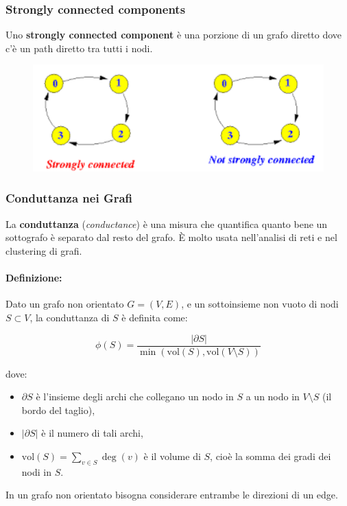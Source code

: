 \subsubsection*{Strongly connected components}
Uno \textbf{strongly connected component} è una porzione di un grafo diretto dove c'è un path diretto tra tutti i nodi. 
\\
\begin{figure}[th]
    \centering
    \includegraphics[scale=0.4]{Introduction/img/stronglyconnected.png}
    \label{fig:stronglyconnected}
\end{figure}

\subsubsection*{Conduttanza nei Grafi}

La \textbf{conduttanza} (\textit{conductance}) è una misura che quantifica quanto bene un sottografo è separato dal resto del grafo. È molto usata nell'analisi di reti e nel clustering di grafi.

\paragraph{Definizione:}

Dato un grafo non orientato \( G = (V, E) \), e un sottoinsieme non vuoto di nodi \( S \subset V \), la conduttanza di \( S \) è definita come:

\[
\phi(S) = \frac{|\partial S|}{\min(\mathrm{vol}(S), \mathrm{vol}(V \setminus S))}
\]

dove:
\begin{itemize}
    \item \( \partial S \) è l'insieme degli archi che collegano un nodo in \( S \) a un nodo in \( V \setminus S \) (il bordo del taglio),
    \item \( |\partial S| \) è il numero di tali archi,
    \item \( \mathrm{vol}(S) = \sum_{v \in S} \deg(v) \) è il volume di \( S \), cioè la somma dei gradi dei nodi in \( S \).
\end{itemize}
In un grafo non orientato bisogna considerare entrambe le direzioni di un edge. 

